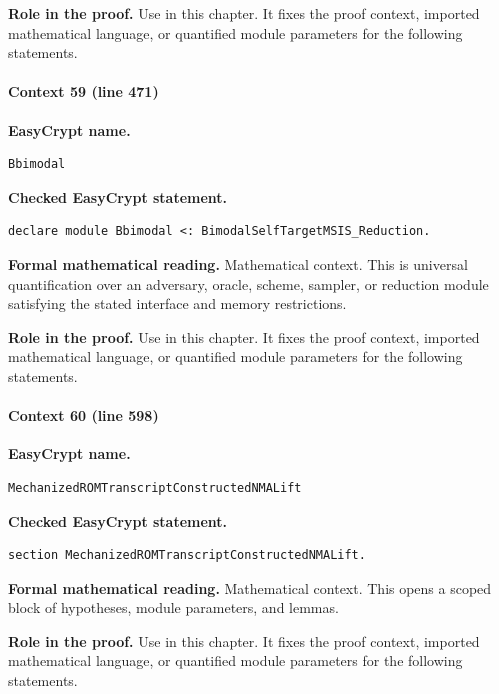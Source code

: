 \noindent\textbf{Role in the proof.}
Use in this chapter. It fixes the proof context, imported mathematical language, or quantified module parameters for the following statements.

\paragraph{Context 59 (line 471)}
\noindent\textbf{EasyCrypt name.}
\begin{lstlisting}[language=EasyCrypt,basicstyle=\ttfamily\scriptsize]
Bbimodal
\end{lstlisting}
\noindent\textbf{Checked EasyCrypt statement.}
\begin{lstlisting}[language=EasyCrypt,basicstyle=\ttfamily\scriptsize]
declare module Bbimodal <: BimodalSelfTargetMSIS_Reduction.
\end{lstlisting}
\noindent\textbf{Formal mathematical reading.}
Mathematical context. This is universal quantification over an adversary, oracle, scheme, sampler, or reduction module satisfying the stated interface and memory restrictions.

\noindent\textbf{Role in the proof.}
Use in this chapter. It fixes the proof context, imported mathematical language, or quantified module parameters for the following statements.

\paragraph{Context 60 (line 598)}
\noindent\textbf{EasyCrypt name.}
\begin{lstlisting}[language=EasyCrypt,basicstyle=\ttfamily\scriptsize]
MechanizedROMTranscriptConstructedNMALift
\end{lstlisting}
\noindent\textbf{Checked EasyCrypt statement.}
\begin{lstlisting}[language=EasyCrypt,basicstyle=\ttfamily\scriptsize]
section MechanizedROMTranscriptConstructedNMALift.
\end{lstlisting}
\noindent\textbf{Formal mathematical reading.}
Mathematical context. This opens a scoped block of hypotheses, module parameters, and lemmas.

\noindent\textbf{Role in the proof.}
Use in this chapter. It fixes the proof context, imported mathematical language, or quantified module parameters for the following statements.

